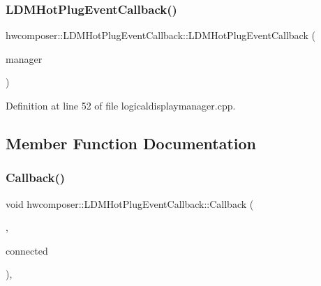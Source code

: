 \subsubsection{\texorpdfstring{L\+D\+M\+Hot\+Plug\+Event\+Callback()}{LDMHotPlugEventCallback()}}
{\footnotesize\ttfamily hwcomposer\+::\+L\+D\+M\+Hot\+Plug\+Event\+Callback\+::\+L\+D\+M\+Hot\+Plug\+Event\+Callback (\begin{DoxyParamCaption}\item[{\mbox{\hyperlink{classhwcomposer_1_1LogicalDisplayManager}{Logical\+Display\+Manager}} $\ast$}]{manager }\end{DoxyParamCaption})\hspace{0.3cm}{\ttfamily [inline]}}



Definition at line 52 of file logicaldisplaymanager.\+cpp.


\begin{DoxyCode}{0}
\end{DoxyCode}


\subsection{Member Function Documentation}
\mbox{\label{classhwcomposer_1_1LDMHotPlugEventCallback_ab5e17c96c17c3707c3ef98d856807822}} 
\subsubsection{\texorpdfstring{Callback()}{Callback()}}
{\footnotesize\ttfamily void hwcomposer\+::\+L\+D\+M\+Hot\+Plug\+Event\+Callback\+::\+Callback (\begin{DoxyParamCaption}\item[{uint32\+\_\+t}]{,  }\item[{bool}]{connected }\end{DoxyParamCaption})\hspace{0.3cm}{\ttfamily [inline]}, {\ttfamily [virtual]}}



